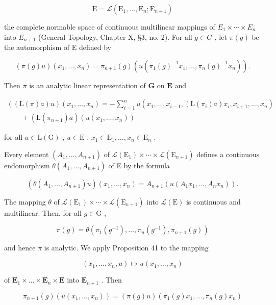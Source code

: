\[
\mathrm{E} = \mathscr {L} (\mathrm{E} _ {1}, \dots , \mathrm{E} _ {n}; \mathrm{E} _ {n + 1})
\]

the complete normable space of continuous multilinear mappings of \(E_{1} \times \cdots \times E_{n}\) into \(E_{n+1}\) (General Topology, Chapter X, §3, no. 2). For all \(g \in G\) , let \(\pi(g)\) be the automorphism of E defined by

\[
(\pi (g) u) (x _ {1}, \dots , x _ {n}) = \pi_ {n + 1} (g) (u (\pi_ {1} (g) ^ {- 1} x _ {1}, \dots , \pi_ {n} (g) ^ {- 1} x _ {n})).
\]

Then \(\pi\) is an analytic linear representation of \(\mathbf{G}\) on \(\mathbf{E}\) and

\[
\begin{array}{l} ((\mathrm{L} (\pi) a) u) (x _ {1}, \ldots , x _ {n}) = - \sum_ {i = 1} ^ {n} u (x _ {1}, \ldots , x _ {i - 1}, (\mathrm{L} (\pi_ {i}) a) x _ {i}, x _ {i + 1}, \ldots , x _ {n}) \\ \qquad + (\mathrm{L} (\pi_ {n + 1}) a) (u (x _ {1}, \ldots , x _ {n})) \end{array}
\]

for all \(a \in \mathrm{L}(\mathrm{G})\) , \(u \in \mathrm{E}\) , \(x_1 \in \mathrm{E}_1, \ldots, x_n \in \mathrm{E}_n\) .

Every element \((A_{1},\ldots,A_{n+1})\) of \(\mathcal{L}(\mathrm{E}_{1})\times\cdots\times\mathcal{L}(\mathrm{E}_{n+1})\) defines a continuous endomorphism \(\theta(A_{1},\ldots,A_{n+1})\) of E by the formula

\[
(\theta (A _ {1}, \dots , A _ {n + 1}) u) (x _ {1}, \dots , x _ {n}) = A _ {n + 1} (u (A _ {1} x _ {1}, \dots , A _ {n} x _ {n})).
\]

The mapping \(\theta\) of \(\mathcal{L}(\mathrm{E}_1) \times \cdots \times \mathcal{L}(\mathrm{E}_{n+1})\) into \(\mathcal{L}(\mathrm{E})\) is continuous and multilinear. Then, for all \(g \in \mathrm{G}\) ,

\[
\pi (g) = \theta (\pi_ {1} (g ^ {- 1}), \dots , \pi_ {n} (g ^ {- 1}), \pi_ {n + 1} (g))
\]

and hence \(\pi\) is analytic. We apply Proposition 41 to the mapping

\[
\left(x _ {1}, \dots , x _ {n}, u\right) \mapsto u \left(x _ {1}, \dots , x _ {n}\right)
\]

of \(\mathbf{E}_1\times \dots \times \mathbf{E}_n\times \mathbf{E}\) into \(\mathbf{E}_{n + 1}\) . Then

\[
\pi_ {n + 1} (g) \left(u \left(x _ {1}, \dots , x _ {n}\right)\right) = (\pi (g) u) \left(\pi_ {1} (g) x _ {1}, \dots , \pi_ {n} (g) x _ {n}\right)
\]

